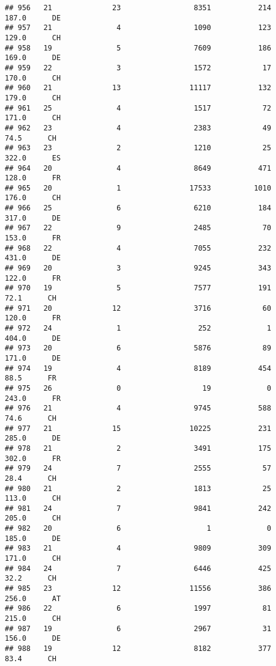 \documentclass[
]{article}
\begin{document}
\begin{verbatim}
## 956   21              23                 8351           214    187.0      DE
## 957   21               4                 1090           123    129.0      CH
## 958   19               5                 7609           186    169.0      DE
## 959   22               3                 1572            17    170.0      CH
## 960   21              13                11117           132    179.0      CH
## 961   25               4                 1517            72    171.0      CH
## 962   23               4                 2383            49     74.5      CH
## 963   23               2                 1210            25    322.0      ES
## 964   20               4                 8649           471    128.0      FR
## 965   20               1                17533          1010    176.0      CH
## 966   25               6                 6210           184    317.0      DE
## 967   22               9                 2485            70    153.0      FR
## 968   22               4                 7055           232    431.0      DE
## 969   20               3                 9245           343    122.0      FR
## 970   19               5                 7577           191     72.1      CH
## 971   20              12                 3716            60    120.0      FR
## 972   24               1                  252             1    404.0      DE
## 973   20               6                 5876            89    171.0      DE
## 974   19               4                 8189           454     88.5      FR
## 975   26               0                   19             0    243.0      FR
## 976   21               4                 9745           588     74.6      CH
## 977   21              15                10225           231    285.0      DE
## 978   21               2                 3491           175    302.0      FR
## 979   24               7                 2555            57     28.4      CH
## 980   21               2                 1813            25    113.0      CH
## 981   24               7                 9841           242    205.0      CH
## 982   20               6                    1             0    185.0      DE
## 983   21               4                 9809           309    171.0      CH
## 984   24               7                 6446           425     32.2      CH
## 985   23              12                11556           386    256.0      AT
## 986   22               6                 1997            81    215.0      CH
## 987   19               6                 2967            31    156.0      DE
## 988   19              12                 8182           377     83.4      CH

\end{verbatim}
\end{document}
